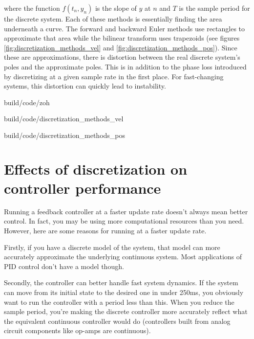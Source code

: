 where the function $f(t_n, y_n)$ is the slope of $y$ at $n$ and $T$ is the
sample period for the discrete system. Each of these methods is essentially
finding the area underneath a curve. The forward and backward Euler methods use
rectangles to approximate that area while the bilinear transform uses
trapezoids (see figures \ref{fig:discretization_methods_vel} and
\ref{fig:discretization_methods_pos}). Since these are approximations, there is
distortion between the real discrete system's poles and the approximate poles.
This is in addition to the phase loss introduced by discretizing at a given
sample rate in the first place. For fast-changing systems, this distortion can
quickly lead to instability.

\begin{svg}{build/code/zoh}
    \caption{Zero-order hold of a system response}
    \label{fig:zoh}
\end{svg}

\begin{svg}{build/code/discretization_methods_vel}
  \caption{Discretization methods applied to velocity data}
  \label{fig:discretization_methods_vel}
\end{svg}

\begin{svg}{build/code/discretization_methods_pos}
  \caption{Position plot of discretization methods applied to velocity data}
  \label{fig:discretization_methods_pos}
\end{svg}

\section{Effects of discretization on controller performance}

Running a feedback controller at a faster update rate doesn't always mean better
control. In fact, you may be using more computational resources than you need.
However, here are some reasons for running at a faster update rate.

Firstly, if you have a discrete model of the system, that model can more
accurately approximate the underlying continuous system. Most applications of
PID control don't have a model though.

Secondly, the controller can better handle fast system dynamics. If the system
can move from its initial state to the desired one in under 250ms, you obviously
want to run the controller with a period less than this. When you reduce the
sample period, you're making the discrete controller more accurately reflect
what the equivalent continuous controller would do (controllers built from
analog circuit components like op-amps are continuous).

